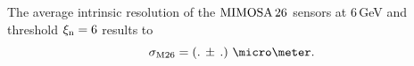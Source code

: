 
%


The average intrinsic resolution of the $\textrm{MIMOSA\,26}$ sensors at 6\,GeV and threshold $\xi_{\textrm{n}} = 6$ results to
\begin{equation}
 \sigma_{\textrm{M26}} = \left( .\,\pm\, \allowbreak . \right)\,\micro\meter.  
\end{equation}

